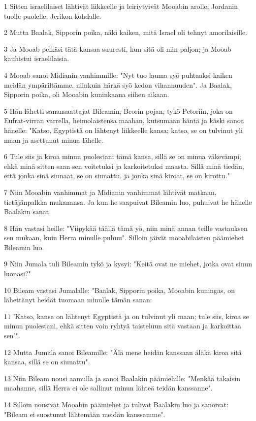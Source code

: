 \par 1 Sitten israelilaiset lähtivät liikkeelle ja leiriytyivät Mooabin arolle, Jordanin tuolle puolelle, Jerikon kohdalle.
\par 2 Mutta Baalak, Sipporin poika, näki kaiken, mitä Israel oli tehnyt amorilaisille.
\par 3 Ja Mooab pelkäsi tätä kansaa suuresti, kun sitä oli niin paljon; ja Mooab kauhistui israelilaisia.
\par 4 Mooab sanoi Midianin vanhimmille: "Nyt tuo lauma syö puhtaaksi kaiken meidän ympäriltämme, niinkuin härkä syö kedon vihannuuden". Ja Baalak, Sipporin poika, oli Mooabin kuninkaana siihen aikaan.
\par 5 Hän lähetti sanansaattajat Bileamin, Beorin pojan, tykö Petoriin, joka on Eufrat-virran varrella, heimolaistensa maahan, kutsumaan häntä ja käski sanoa hänelle: "Katso, Egyptistä on lähtenyt liikkeelle kansa; katso, se on tulvinut yli maan ja asettunut minua lähelle.
\par 6 Tule siis ja kiroa minun puolestani tämä kansa, sillä se on minua väkevämpi; ehkä minä sitten saan sen voitetuksi ja karkoitetuksi maasta. Sillä minä tiedän, että jonka sinä siunaat, se on siunattu, ja jonka sinä kiroat, se on kirottu."
\par 7 Niin Mooabin vanhimmat ja Midianin vanhimmat lähtivät matkaan, tietäjänpalkka mukanansa. Ja kun he saapuivat Bileamin luo, puhuivat he hänelle Baalakin sanat.
\par 8 Hän vastasi heille: "Viipykää täällä tämä yö, niin minä annan teille vastauksen sen mukaan, kuin Herra minulle puhuu". Silloin jäivät mooabilaisten päämiehet Bileamin luo.
\par 9 Niin Jumala tuli Bileamin tykö ja kysyi: "Keitä ovat ne miehet, jotka ovat sinun luonasi?"
\par 10 Bileam vastasi Jumalalle: "Baalak, Sipporin poika, Mooabin kuningas, on lähettänyt heidät tuomaan minulle tämän sanan:
\par 11 'Katso, kansa on lähtenyt Egyptistä ja on tulvinut yli maan; tule siis, kiroa se minun puolestani, ehkä sitten voin ryhtyä taisteluun sitä vastaan ja karkoittaa sen'".
\par 12 Mutta Jumala sanoi Bileamille: "Älä mene heidän kanssaan äläkä kiroa sitä kansaa, sillä se on siunattu".
\par 13 Niin Bileam nousi aamulla ja sanoi Baalakin päämiehille: "Menkää takaisin maahanne, sillä Herra ei ole sallinut minun lähteä teidän kanssanne".
\par 14 Silloin nousivat Mooabin päämiehet ja tulivat Baalakin luo ja sanoivat: "Bileam ei suostunut lähtemään meidän kanssamme".

